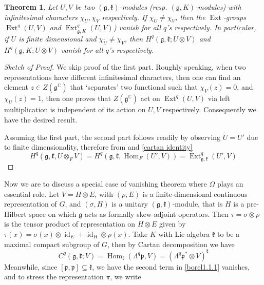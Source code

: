 \documentclass[11pt]{report}
\theoremstyle{definition}
\theoremstyle{plain}
\newtheorem{Theo}[Def]{Theorem}
\DeclareMathOperator{\id}{id}
\DeclareMathOperator{\Ext}{Ext}
\DeclareMathOperator{\Hom}{Hom}
\newcommand{\complex}{\mathbb{C}}
\renewcommand{\tilde}{\widetilde}
\newcommand{\Lie}[1]{\mathfrak{#1}}
\begin{document}
\begin{Theo}\label{borel1.4.2}
	\textnormal{\cite[Theorem~4.1\& Theorem~5.3]{borel2013}} Let $U, V$ be two $(\Lie{g}, \Lie{k})$-modules (resp. $(\Lie{g}, K)$-modules) with infinitesimal characters $\chi_U, \chi_V$ respectively. If $\chi_U\neq \chi_V$, then the $\Ext$-groups $\Ext^q(U,V)$ and $\Ext^q_{\Lie{g}, K}(U,V)$) vanish for all $q$'s respectively. In particular, if $U$ is finite dimensional and $\chi_{\tilde{U}}\neq \chi_V$, then $H^q(\Lie{g}, \Lie{k}; U\otimes V)$ and $H^q(\Lie{g}, K; U\otimes V)$ vanish for all $q$'s respectively.
\end{Theo}
\begin{proof}[Sketch of Proof]
	We skip proof of the first part. Roughly speaking, when two representations have different infinitesimal characters, then one can find an element $z\in Z(\Lie{g}^\complex)$ that `separates' two functional such that $\chi_V(z)=0$, and $\chi_U(z)=1$, then one proves that $Z(\Lie{g}^\complex)$ act on $\Ext^q(U,V)$ via left multiplication is independent of its action on $U,V$ respectively. Consequently we have the desired result.
	\par Assuming the first part, the second part follows readily by observing $\tilde{U}=U'$ due to finite dimensionality, therefore from  and \ref{cartan identity}
	\begin{equation}
	H^q(\Lie{g},\Lie{k},U\otimes_F V)=H^q(\Lie{g},\Lie{k},\Hom_F(U',V))=\Ext^q_{\Lie{g},\Lie{k}}(U',V)
	\end{equation}	
\end{proof}
Now we are to discuss a special case of vanishing theorem where $\Omega$ plays an essential role. Let $V=H\otimes E$, with $(\rho,E)$ is a finite-dimensional continuous representation of $G$, and $(\sigma,H)$ is a unitary $(\Lie{g},\Lie{k})$-module, that is $H$ is a pre-Hilbert space on which $\Lie{g}$ acts as formally skew-adjoint operators. Then $\tau=\sigma\otimes \rho$  is the tensor product of representation on $H\otimes E$ given by $\tau(x)=\sigma(x)\otimes \id_E+\id_H\otimes \rho(x)$. Take $K$ with Lie algebra $\Lie{k}$ to be a maximal compact subgroup of $G$, then by Cartan decomposition we have 
\begin{equation}\label{borel2.1.4(1)}
C^q(\Lie{g}, \Lie{k};V)=\Hom_{\Lie{k}}(\Lambda^q\Lie{p},V)=(\Lambda^q\Lie{p}^*\otimes V)^\Lie{k}
\end{equation}
Meanwhile, since $[\Lie{p}, \Lie{p}]\subseteq \Lie{k}$, we have the second term in \ref{borel1.1.1} vanishes, and to stress the representation $\pi$, we write
\end{document}
